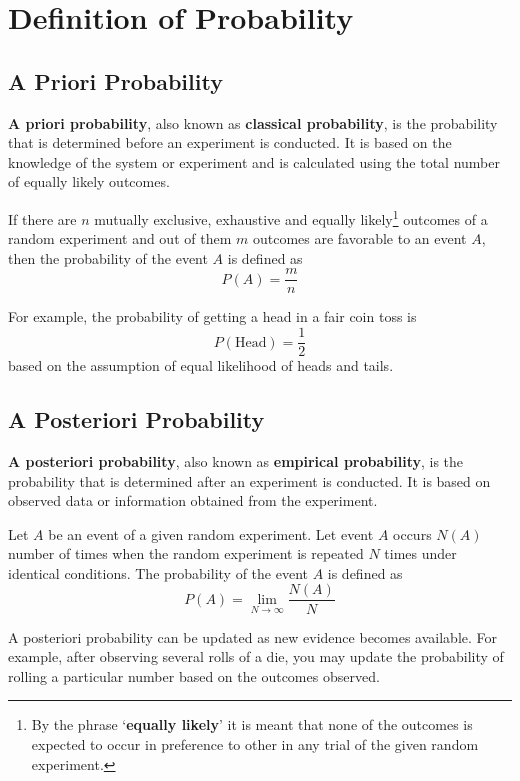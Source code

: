 \documentclass[twoside]{book}
\begin{document}
\section{Definition of Probability}

\subsection{A Priori Probability}
    \textbf{A priori probability}, also known as \textbf{classical probability}, is the probability that is determined before an experiment is conducted. It is based on the knowledge of the system or experiment and is calculated using the total number of equally likely outcomes.

    \begin{textbox}
        If there are $n$ mutually exclusive, exhaustive and equally likely\footnote{By the phrase `\textbf{equally likely}' it is meant that none of the outcomes is expected to occur in preference to other in any trial of the given random experiment.} outcomes of a random experiment and out of them $m$ outcomes are favorable to an event $A$, then the probability of the event $A$ is defined as $$P(A) = \dfrac{m}{n}$$
    \end{textbox}
    For example, the probability of getting a head in a fair coin toss is $$P(\text{Head}) = \frac{1}{2}$$ based on the assumption of equal likelihood of heads and tails.

    \subsection{A Posteriori Probability}
    \textbf{A posteriori probability}, also known as \textbf{empirical probability}, is the probability that is determined after an experiment is conducted. It is based on observed data or information obtained from the experiment.

    \begin{textbox}
        Let $A$ be an event of a given random experiment. Let event $A$ occurs $N(A)$ number of times when the random experiment is repeated $N$ times under identical conditions. The probability of the event $A$ is defined as $$P(A) = \lim_{N\to \infty}\dfrac{N(A)}{N}$$
    \end{textbox}

    A posteriori probability can be updated as new evidence becomes available. For example, after observing several rolls of a die, you may update the probability of rolling a particular number based on the outcomes observed.
\end{document}
